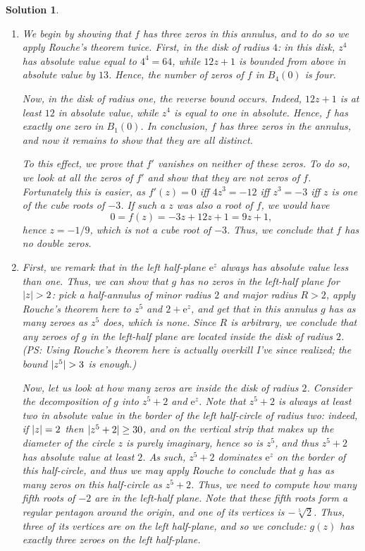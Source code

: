 \documentclass{article}
\theoremstyle{nonumberplain}
\newtheorem{sol}{Solution}
\newcommand{\e}{\mathrm{e}}
\DeclarePairedDelimiter{\abs}{\lvert}{\rvert}
\begin{document}
\begin{sol}
\leavevmode
\begin{enumerate}
\item We begin by showing that $f$ has three zeros in this annulus, and to do so we apply Rouche's theorem twice. First, in the disk of radius $4$: in this disk, $z^4$ has absolute value equal to $4^4 = 64$, while $12z+1$ is bounded from above in absolute value by $13$. Hence, the number of zeros of $f$ in $B_4(0)$ is four.

Now, in the disk of radius one, the reverse bound occurs. Indeed, $12z+1$ is at least $12$ in absolute value, while $z^4$ is equal to one in absolute. Hence, $f$ has exactly one zero in $B_1(0)$. In conclusion, $f$ has three zeros in the annulus, and now it remains to show that they are all distinct.

To this effect, we prove that $f'$ vanishes on neither of these zeros. To do so, we look at all the zeros of $f'$ and show that they are not zeros of $f$. Fortunately this is easier, as $f'(z) = 0$ iff $4 z^3 = -12$ iff $z^3 = -3$ iff $z$ is one of the cube roots of $-3$. If such a $z$ was also a root of $f$, we would have
\begin{equation}
0 = f(z) = -3z + 12z + 1 = 9z + 1,
\end{equation} 
hence $z = -1/9$, which is not a cube root of $-3$. Thus, we conclude that $f$ has no double zeros.

\item First, we remark that in the left half-plane $\e^z$ always has absolute value less than one. Thus, we can show that $g$ has no zeros in the left-half plane for $\abs z > 2$: pick a half-annulus of minor radius $2$ and major radius $R > 2$, apply Rouche's theorem here to $z^5$ and $2 + \e^z$, and get that in this annulus $g$ has as many zeroes as $z^5$ does, which is none. Since $R$ is arbitrary, we conclude that any zeroes of $g$ in the left-half plane are located inside the disk of radius $2$. (PS: Using Rouche's theorem here is actually overkill I've since realized; the bound $\abs{z^5} > 3$ is enough.)

Now, let us look at how many zeros are inside the disk of radius $2$. Consider the decomposition of $g$ into $z^5 + 2$ and $\e^z$. Note that $z^5 + 2$ is always at least two in absolute value in the border of the left half-circle of radius two: indeed, if $\abs z = 2$ then $\abs{z^5 + 2} \geq 30$, and on the vertical strip that makes up the diameter of the circle $z$ is purely imaginary, hence so is $z^5$, and thus $z^5 + 2$ has absolute value at least $2$. As such, $z^5 + 2$ dominates $\e^z$ on the border of this half-circle, and thus we may apply Rouche to conclude that $g$ has as many zeros on this half-circle as $z^5 + 2$. Thus, we need to compute how many fifth roots of $-2$ are in the left-half plane. Note that these fifth roots form a regular pentagon around the origin, and one of its vertices is $-\sqrt[5]2$. Thus, three of its vertices are on the left half-plane, and so we conclude: $g(z)$ has exactly three zeroes on the left half-plane.
\end{enumerate}
\end{sol}
\end{document}
